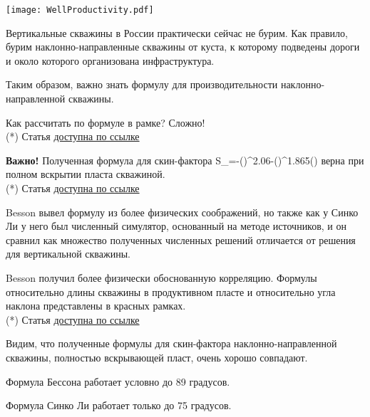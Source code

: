 \documentclass[main.tex]{subfiles}
\begin{document}
\texttt{[image: WellProductivity.pdf]}

Вертикальные скважины в России практически сейчас не бурим. Как правило, бурим наклонно-направленные скважины от куста, к которому подведены дороги и около которого организована инфраструктура.

Таким образом, важно знать формулу для производительности наклонно-направленной скважины.

Как рассчитать по формуле в рамке? Сложно!\\

(*) Статья \href{https://mualal.github.io/source/tex/hydrocarbons2022/articles/cinco1975.pdf}{доступна по ссылке}


\textbf{Важно!} Полученная формула для скин-фактора
\beq
S_\theta=-\left(\right)^{2.06}-\left(\right)^{1.865}\cdot{}\left(\right)
\eeq
верна при полном вскрытии пласта скважиной.\\

(*) Статья \href{https://mualal.github.io/source/tex/hydrocarbons2022/articles/cinco1975.pdf}{доступна по ссылке}


Besson вывел формулу из более физических соображений, но также как у Синко Ли у него был численный симулятор, основанный на методе источников, и он сравнил как множество полученных численных решений отличается от решения для вертикальной скважины.

Besson получил более физически обоснованную корреляцию. Формулы относительно длины скважины в продуктивном пласте и относительно угла наклона представлены в красных рамках.\\

(*) Статья \href{https://mualal.github.io/source/tex/hydrocarbons2022/articles/besson1990.pdf}{доступна по ссылке}


Видим, что полученные формулы для скин-фактора наклонно-направленной скважины, полностью вскрывающей пласт, очень хорошо совпадают.

Формула Бессона работает условно до 89 градусов.

Формула Синко Ли работает только до 75 градусов.
\end{document}
